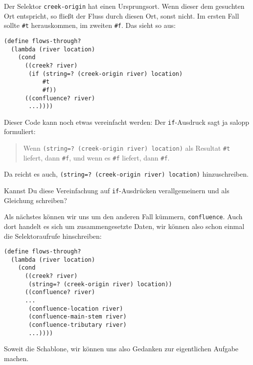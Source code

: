 %
Der Selektor \lstinline{creek-origin} hat einen Ursprungsort.  Wenn dieser dem
gesuchten Ort entspricht, so fließt der Fluss durch diesen Ort, sonst
nicht.  Im ersten Fall sollte \lstinline{#t} herauskommen, im zweiten
\lstinline{#f}.  Das sieht so aus:
%
\begin{lstlisting}
(define flows-through?
  (lambda (river location)
    (cond
      ((creek? river)
       (if (string=? (creek-origin river) location)
           #t
           #f))
      ((confluence? river)
       ...))))
\end{lstlisting}
%
Dieser Code kann noch etwas vereinfacht werden: Der
\lstinline{if}-Ausdruck sagt ja salopp formuliert:
%
\begin{quote}
  Wenn \lstinline{(string=? (creek-origin river) location)} als
  Resultat \lstinline{#t} liefert, dann \lstinline{#f}, und wenn es
  \lstinline{#f} liefert, dann \lstinline{#f}.
\end{quote}
%
Da reicht es auch, \lstinline{(string=? (creek-origin river) location)} hinzuschreiben.
%
\begin{aufgabe}\label{aufgabe:iftruefalse}
  Kannst Du diese Vereinfachung auf \lstinline{if}-Ausdrücken
  verallgemeinern und als Gleichung schreiben?
\end{aufgabe}
%
Als nächstes können wir uns um den anderen Fall kümmern,
\lstinline{confluence}.  Auch dort handelt es sich um
zusammengesetzte Daten, wir können also schon einmal die
Selektoraufrufe hinschreiben:
%
\begin{lstlisting}
(define flows-through?
  (lambda (river location)
    (cond
      ((creek? river)
       (string=? (creek-origin river) location))
      ((confluence? river)
      ...
       (confluence-location river)
       (confluence-main-stem river)
       (confluence-tributary river)
       ...))))
\end{lstlisting}
%
Soweit die Schablone, wir können uns also Gedanken zur eigentlichen
Aufgabe machen.

